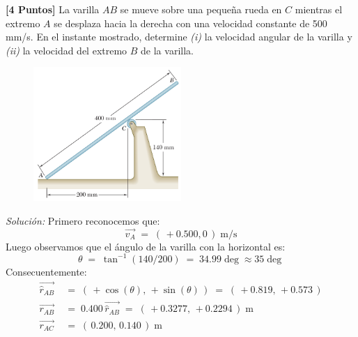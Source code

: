 \documentclass[ a4paper, twoside, 11pt]{article}
\begin{document}
\begin{problem}
\textbf{[4 Puntos]} La varilla $AB$ se mueve sobre una peque\~na rueda en $C$ mientras el extremo $A$ se desplaza hacia la derecha con una velocidad constante de 500 mm/s. En el instante mostrado, determine \textit{(i)} la velocidad angular de la varilla y \textit{(ii)} la velocidad del extremo $B$ de la varilla.

\begin{figure}[htb]
\centering
\includegraphics[width=0.5\textwidth]{problema-2.jpg}
\end{figure}

\emph{Soluci\'on:} Primero reconocemos que: 
\[
\vec{v_A} \; = \; ( \, +0.500, 0 \, ) \; \text{m/s}
\]
Luego observamos que el \'angulo de la varilla con la horizontal es: 
\[
\theta \; = \; \tan^{-1}(140/200) \; = \; 34.99\deg \approx 35 \deg
\]
Consecuentemente: 
\begin{align*}
\vec{\hat{r}_{AB}} \; & = \;
( \, +\cos(\theta), \, +\sin(\theta) \, ) \; = \;
( \, +0.819, \, +0.573 \, ) \\
\vec{r_{AB}} \; & = \; 0.400 \, \vec{\hat{r}_{AB}} \; = \;
( \, +0.3277, \, +0.2294 \, ) \; \text{m} \\
\vec{r_{AC}} \; & = \; ( \, 0.200, \, 0.140 \, ) \; \text{m}
\end{align*}


\end{problem}
\end{document}
